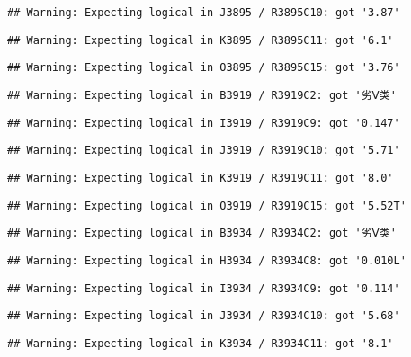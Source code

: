 \documentclass[
]{article}
\begin{document}
\begin{verbatim}
## Warning: Expecting logical in J3895 / R3895C10: got '3.87'
\end{verbatim}

\begin{verbatim}
## Warning: Expecting logical in K3895 / R3895C11: got '6.1'
\end{verbatim}

\begin{verbatim}
## Warning: Expecting logical in O3895 / R3895C15: got '3.76'
\end{verbatim}

\begin{verbatim}
## Warning: Expecting logical in B3919 / R3919C2: got '劣Ⅴ类'
\end{verbatim}

\begin{verbatim}
## Warning: Expecting logical in I3919 / R3919C9: got '0.147'
\end{verbatim}

\begin{verbatim}
## Warning: Expecting logical in J3919 / R3919C10: got '5.71'
\end{verbatim}

\begin{verbatim}
## Warning: Expecting logical in K3919 / R3919C11: got '8.0'
\end{verbatim}

\begin{verbatim}
## Warning: Expecting logical in O3919 / R3919C15: got '5.52T'
\end{verbatim}

\begin{verbatim}
## Warning: Expecting logical in B3934 / R3934C2: got '劣Ⅴ类'
\end{verbatim}

\begin{verbatim}
## Warning: Expecting logical in H3934 / R3934C8: got '0.010L'
\end{verbatim}

\begin{verbatim}
## Warning: Expecting logical in I3934 / R3934C9: got '0.114'
\end{verbatim}

\begin{verbatim}
## Warning: Expecting logical in J3934 / R3934C10: got '5.68'
\end{verbatim}

\begin{verbatim}
## Warning: Expecting logical in K3934 / R3934C11: got '8.1'
\end{verbatim}
\end{document}
